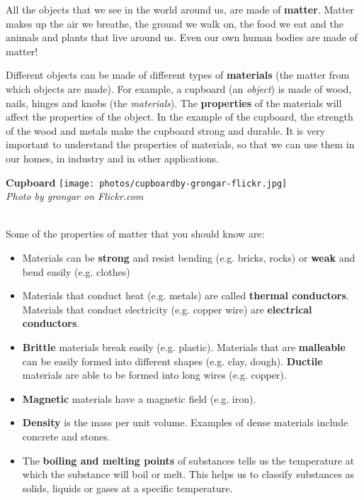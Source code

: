             \label{m38708*id62175}All the objects that we see in the world around us, are made of \textbf{matter}. Matter makes up the air we breathe, the ground we walk on, the food we eat and the animals and plants that live around us. Even our own human bodies are made of matter! \newline
\begin{minipage}{.5\textwidth}
      \label{m38708*id62185}Different objects can be made of different types of \textbf{materials} (the matter from which objects are made). For example, a cupboard (an \textsl{object}) is made of wood, nails, hinges and knobs (the \textsl{materials}). The \textbf{properties} of the materials will affect the properties of the object. In the example of the cupboard, the strength of the wood and metals make the cupboard strong and durable. It is very important to understand the properties of materials, so that we can use them in our homes, in industry and in other applications. \par 
\end{minipage}
\begin{minipage}{.5\textwidth}
\begin{center}
\textbf{Cupboard}
 \texttt{[image: photos/cupboardby-grongar-flickr.jpg]}\\
\textit{Photo by grongar on Flickr.com}
\end{center}
\end{minipage} \\
\label{m38708*id0132}Some of the properties of matter that you should know are:
\label{m38708*lid825}\begin{itemize}[noitemsep]
  \item Materials can be \textbf{strong} and resist bending (e.g. bricks, rocks) or \textbf{weak} and bend easily (e.g. clothes)
  \item Materials that conduct heat (e.g. metals) are called \textbf{thermal conductors}. Materials that conduct electricity (e.g. copper wire) are \textbf{electrical conductors}.
  \item \textbf{Brittle} materials break easily (e.g. plastic). Materials that are \textbf{malleable} can be easily formed into different shapes (e.g. clay, dough). \textbf{Ductile} materials are able to be formed into long wires (e.g. copper).
  \item \textbf{Magnetic} materials have a magnetic field (e.g. iron).
  \item \textbf{Density} is the mass per unit volume. Examples of dense materials include concrete and stones.
  \item The \textbf{boiling and melting points} of substances tells us the temperature at which the substance will boil or melt. This helps us to classify substances as solids, liquids or gases at a specific temperature.\end{itemize}
